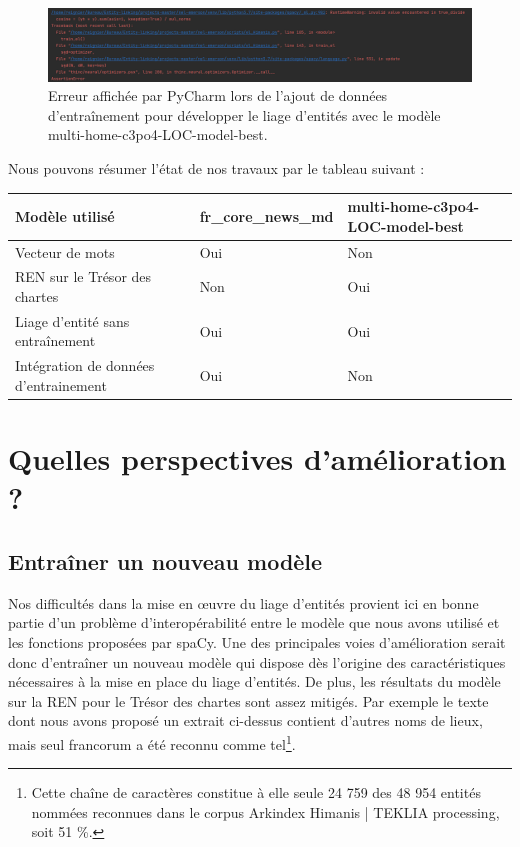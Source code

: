 \documentclass[a4paper,12pt,twoside]{book}
\begin{document}
	\begin{figure}
		\centering
		\includegraphics[width=\textwidth]{Images/Erreur_el.png}
		\caption{Erreur affichée par PyCharm lors de l'ajout de données d'entraînement pour développer le liage d'entités avec le modèle \og multi-home-c3po4-LOC-model-best\fg{}.}
		\label{Erreur_el}
	\end{figure}
	
	\noindent Nous pouvons résumer l'état de nos travaux par le tableau suivant :
	
	\begin{center}
		\begin{tabular}{|p{7cm}|p{4cm}|p{4cm}|}
			\hline
			Modèle utilisé & fr\_core\_news\_md & multi-home-c3po4-LOC-model-best\\
			\hline
			Vecteur de mots & Oui & Non \\ \hline
			REN sur le Trésor des chartes & Non & Oui \\ \hline
			Liage d'entité sans entraînement & Oui & Oui \\ \hline
			Intégration de données d'entrainement & Oui & Non \\ \hline
		\end{tabular}
	\end{center}
	
	\section{Quelles perspectives d'amélioration ?}
	
	\subsection{Entraîner un nouveau modèle}
	
	Nos difficultés dans la mise en œuvre du liage d'entités provient ici en bonne partie d'un problème d'interopérabilité entre le modèle que nous avons utilisé et les fonctions proposées par spaCy. Une des principales voies d'amélioration serait donc d'entraîner un nouveau modèle qui dispose dès l'origine des caractéristiques nécessaires à la mise en place du liage d'entités. De plus, les résultats du modèle sur la REN pour le Trésor des chartes sont assez mitigés. Par exemple le texte dont nous avons proposé un extrait ci-dessus contient d'autres noms de lieux, mais seul \og francorum\fg{} a été reconnu comme tel\footnote{Cette chaîne de caractères constitue à elle seule 24 759 des 48 954 entités nommées reconnues dans le corpus Arkindex \og Himanis | TEKLIA processing\fg{}, soit 51 \%.}.
	
\end{document}
